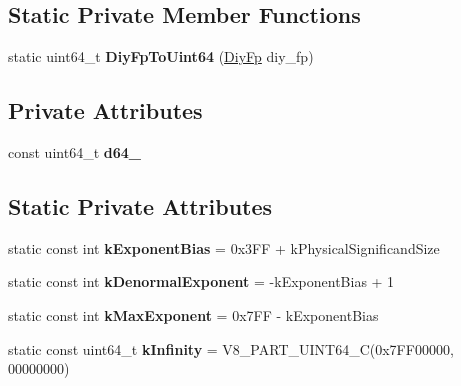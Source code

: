 \subsection*{Static Private Member Functions}
\begin{DoxyCompactItemize}
\item 
static uint64\+\_\+t {\bfseries Diy\+Fp\+To\+Uint64} (\hyperlink{classv8_1_1internal_1_1_diy_fp}{Diy\+Fp} diy\+\_\+fp)\hypertarget{classv8_1_1internal_1_1_double_a4437407d60f3f2ad891ece9c76d09d09}{}\label{classv8_1_1internal_1_1_double_a4437407d60f3f2ad891ece9c76d09d09}

\end{DoxyCompactItemize}
\subsection*{Private Attributes}
\begin{DoxyCompactItemize}
\item 
const uint64\+\_\+t {\bfseries d64\+\_\+}\hypertarget{classv8_1_1internal_1_1_double_a132d028cf11f6bf50dc9d7d16abea419}{}\label{classv8_1_1internal_1_1_double_a132d028cf11f6bf50dc9d7d16abea419}

\end{DoxyCompactItemize}
\subsection*{Static Private Attributes}
\begin{DoxyCompactItemize}
\item 
static const int {\bfseries k\+Exponent\+Bias} = 0x3\+F\+F + k\+Physical\+Significand\+Size\hypertarget{classv8_1_1internal_1_1_double_a14bfe1622023211987ea7b3136229c04}{}\label{classv8_1_1internal_1_1_double_a14bfe1622023211987ea7b3136229c04}

\item 
static const int {\bfseries k\+Denormal\+Exponent} = -\/k\+Exponent\+Bias + 1\hypertarget{classv8_1_1internal_1_1_double_a250b33876b339d0974e97c2338a9c139}{}\label{classv8_1_1internal_1_1_double_a250b33876b339d0974e97c2338a9c139}

\item 
static const int {\bfseries k\+Max\+Exponent} = 0x7\+F\+F -\/ k\+Exponent\+Bias\hypertarget{classv8_1_1internal_1_1_double_af56737f4d5b8165d3c4ef23756190c9b}{}\label{classv8_1_1internal_1_1_double_af56737f4d5b8165d3c4ef23756190c9b}

\item 
static const uint64\+\_\+t {\bfseries k\+Infinity} = V8\+\_\+P\+A\+R\+T\+\_\+\+U\+I\+N\+T64\+\_\+C(0x7\+F\+F00000, 00000000)\hypertarget{classv8_1_1internal_1_1_double_a3bb3f403bc8c0ade7d06bc2e254d3436}{}\label{classv8_1_1internal_1_1_double_a3bb3f403bc8c0ade7d06bc2e254d3436}

\end{DoxyCompactItemize}


